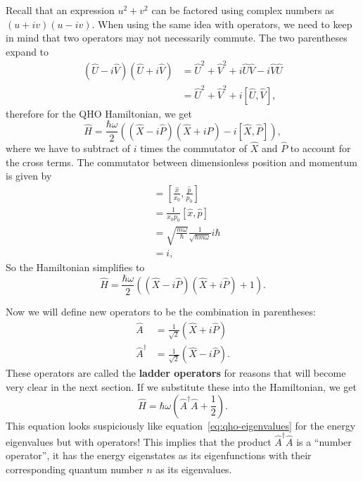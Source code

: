 \documentclass[../quantum_mechanics.tex]{subfiles}
\begin{document}
            Recall that an expression $u^2+v^2$ can be factored using complex numbers as $(u+iv)(u-iv)$.
            When using the same idea with operators, we need to keep in mind that two operators may not necessarily commute.
            The two parentheses expand to
            \begin{align}
                (\hat{U}-i\hat{V})(\hat{U}+i\hat{V})&=\hat{U}^2+\hat{V}^2+i\hat{U}\hat{V}-i\hat{V}\hat{U}\\
                &=\hat{U}^2+\hat{V}^2+i[\hat{U},\hat{V}],
            \end{align}
            therefore for the QHO Hamiltonian, we get
            \begin{equation}
                \hat{H}=\frac{\hbar\omega}{2}((\hat{X}-i\hat{P})(\hat{X}+i\hat{P})-i[\hat{X},\hat{P}]),
            \end{equation}
            where we have to subtract of $i$ times the commutator of $\hat{X}$ and $\hat{P}$ to account for the cross terms.
            The commutator between dimensionless position and momentum is given by
            \begin{align}
                [\hat{X},\hat{P}]&=\left[\frac{\hat{x}}{x_0},\frac{\hat{p}}{p_0}\right]\\
                &=\frac{1}{x_0p_0}[\hat{x},\hat{p}]\\
                &=\sqrt{\frac{m\omega}{\hbar}}\frac{1}{\sqrt{\hbar m\omega}}i\hbar\\
                &=i,
            \end{align}
            So the Hamiltonian simplifies to
            \begin{equation}
                \hat{H}=\frac{\hbar\omega}{2}((\hat{X}-i\hat{P})(\hat{X}+i\hat{P})+1).
            \end{equation}

            Now we will define new operators to be the combination in parentheses:
            \begin{align}
                \hat{A}&=\frac{1}{\sqrt{2}}(\hat{X}+i\hat{P})\\
                \hat{A}^\dagger&=\frac{1}{\sqrt{2}}(\hat{X}-i\hat{P}).
            \end{align}
            These operators are called the \textbf{ladder operators} for reasons that will become very clear in the next section.
            If we substitute these into the Hamiltonian, we get
            \begin{equation}\label{eq:qho-hamiltonian-ladder}
                \hat{H}=\hbar\omega\left(\hat{A}^\dagger\hat{A}+\frac{1}{2}\right).
            \end{equation}
            This equation looks suspiciously like equation~\ref{eq:qho-eigenvalues} for the energy eigenvalues but with operators!
            This implies that the product $\hat{A}^\dagger\hat{A}$ is a ``number operator'', it has the energy eigenstates as its eigenfunctions with their corresponding quantum number $n$ as its eigenvalues.
\end{document}

